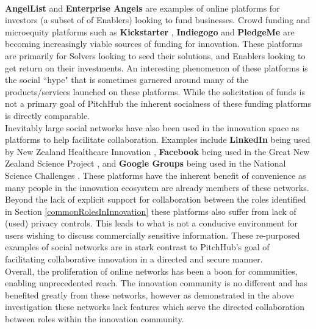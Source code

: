 \\
\newline
\textbf{AngelList} \cite{Angel:online} and \textbf{Enterprise Angels} \cite{enterpriseAngles:online} are examples of online platforms for investors (a subset of of Enablers) looking to fund businesses. Crowd funding and microequity platforms such as \textbf{Kickstarter} \cite{Kicks6:online}, \textbf{Indiegogo} \cite{Indie3:online} and \textbf{PledgeMe} \cite{Pledge:online} are becoming increasingly viable sources of funding for innovation. These platforms are primarily for Solvers looking to seed their solutions, and Enablers looking to get return on their investments. An interesting phenomenon of these platforms is the social ``hype" that is sometimes garnered around many of the products/services launched on these platforms. While the solicitation of funds is not a primary goal of PitchHub the inherent socialness of these funding platforms is directly comparable.
\\
\newline
Inevitably large social networks have also been used in the innovation space as platforms to help facilitate collaboration. Examples include \textbf{LinkedIn} \cite{Linkedin:online} being used by New Zealand Healthcare Innovation \cite{nzHealthCare:online}, \textbf{Facebook} \cite{Faceb6:online} being used in the Great New Zealand Science Project \cite{greatNZScience:online}, and \textbf{Google Groups} \cite{Googlegroups:online} being used in the National Science Challenges \cite{nzNSC10:online}. These platforms have the inherent benefit of convenience as many people in the innovation ecosystem are already members of these networks. Beyond the lack of explicit support for collaboration between the roles identified in Section \ref{commonRolesInInnovation} these platforms also suffer from lack of (used) privacy controls. This leads to what is not a conducive environment for users wishing to discuss commercially sensitive information. These re-purposed examples of social networks are in stark contrast to PitchHub's goal of facilitating collaborative innovation in a directed and secure manner.
\\
\newline
Overall, the proliferation of online networks has been a boon for communities, enabling unprecedented reach. The innovation community is no different and has benefited greatly from these networks, however as demonstrated in the above investigation these networks lack features which serve the directed collaboration between roles within the innovation community.


